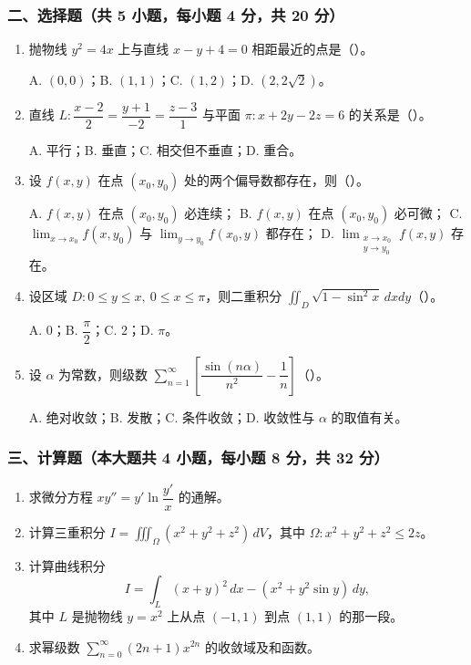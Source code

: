 \subsubsection*{二、选择题（共 5 小题，每小题 4 分，共 20 分）}
\begin{enumerate}
  \item 抛物线 $y^2=4x$ 上与直线 $x-y+4=0$ 相距最近的点是（\quad）。

  A. $(0,0)$；\quad B. $(1,1)$；\quad C. $(1,2)$；\quad D. $(2,2\sqrt2)$。

  \item 直线 $L:\dfrac{x-2}{2}=\dfrac{y+1}{-2}=\dfrac{z-3}{1}$ 与平面 $\pi:x+2y-2z=6$ 的关系是（\quad）。

  A. 平行；\quad B. 垂直；\quad C. 相交但不垂直；\quad D. 重合。

  \item 设 $f(x,y)$ 在点 $(x_0,y_0)$ 处的两个偏导数都存在，则（\quad）。

  A. $f(x,y)$ 在点 $(x_0,y_0)$ 必连续；\quad
  B. $f(x,y)$ 在点 $(x_0,y_0)$ 必可微；\quad
  C. $\displaystyle\lim_{x\to x_0}f(x,y_0)$ 与 $\displaystyle\lim_{y\to y_0}f(x_0,y)$ 都存在；\quad
  D. $\displaystyle\lim_{\substack{x\to x_0\\y\to y_0}}f(x,y)$ 存在。

  \item 设区域 $D:0\le y\le x,\ 0\le x\le\pi$，则二重积分 $\displaystyle\iint_D\sqrt{1-\sin^2x}\,dxdy$（\quad）。

  A. $0$；\quad B. $\dfrac{\pi}{2}$；\quad C. $2$；\quad D. $\pi$。

  \item 设 $\alpha$ 为常数，则级数 $\displaystyle\sum_{n=1}^{\infty}\left[\dfrac{\sin(n\alpha)}{n^2}-\dfrac1n\right]$（\quad）。

  A. 绝对收敛；\quad B. 发散；\quad C. 条件收敛；\quad D. 收敛性与 $\alpha$ 的取值有关。
\end{enumerate}

\subsubsection*{三、计算题（本大题共 4 小题，每小题 8 分，共 32 分）}
\begin{enumerate}
  \item 求微分方程 $xy''=y'\ln\dfrac{y'}{x}$ 的通解。
  \item 计算三重积分 $\displaystyle I=\iiint_{\Omega}(x^2+y^2+z^2)\,dV$，其中 $\Omega:x^2+y^2+z^2\le 2z$。
  \item 计算曲线积分
  \[
  I=\int_L (x+y)^2\,dx-(x^2+y^2\sin y)\,dy,
  \]
  其中 $L$ 是抛物线 $y=x^2$ 上从点 $(-1,1)$ 到点 $(1,1)$ 的那一段。
  \item 求幂级数 $\displaystyle\sum_{n=0}^{\infty}(2n+1)x^{2n}$ 的收敛域及和函数。
\end{enumerate}

